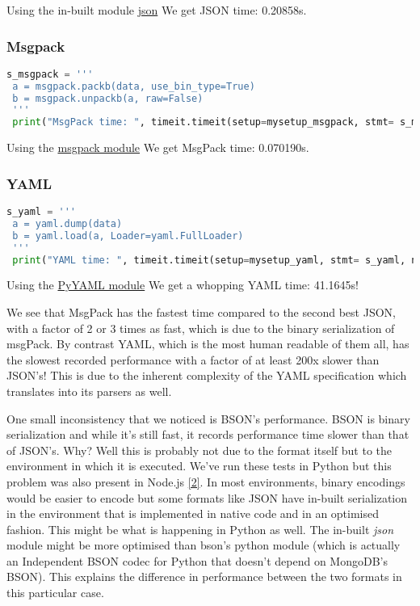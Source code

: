 \documentclass[12pt]{article}
\begin{document}
Using the in-built module \href{https://docs.python.org/3/library/json.html}{json}
We get JSON time:  0.20858s.

\subsubsection{Msgpack}
\begin{lstlisting}[language=python]
 s_msgpack = '''
 a = msgpack.packb(data, use_bin_type=True)
 b = msgpack.unpackb(a, raw=False)
 '''
 print("MsgPack time: ", timeit.timeit(setup=mysetup_msgpack, stmt= s_msgpack, number=10000))

\end{lstlisting}

Using the \href{https://github.com/msgpack/msgpack-python}{msgpack module}
We get MsgPack time:  0.070190s.

\subsubsection{YAML}
\begin{lstlisting}[language=python]
 s_yaml = '''
 a = yaml.dump(data)
 b = yaml.load(a, Loader=yaml.FullLoader)
 '''
 print("YAML time: ", timeit.timeit(setup=mysetup_yaml, stmt= s_yaml, number=10000))

\end{lstlisting}

Using the \href{https://pyyaml.org/wiki/PyYAMLDocumentation}{PyYAML module}
We get a whopping YAML time:  41.1645s!

We see that MsgPack has the fastest time compared to the second best JSON, with a factor of 2 or 3 times as fast, which is due to the binary serialization of msgPack. By contrast YAML, which is the most human readable of them all,  has the slowest recorded performance with a factor of at least 200x slower than JSON’s! This is due to the inherent complexity of the YAML specification which translates into its parsers as well.

One small inconsistency that we noticed is BSON’s performance. BSON is binary serialization and while it’s still fast, it records performance time slower than that of JSON’s. Why? Well this is probably not due to the format itself but to the environment in which it is executed. We’ve run these tests in Python but this problem was also present in Node.js \href{https://stackoverflow.com/questions/36767310/why-is-json-faster-than-bson-in-node-js}{[2]}. In most environments, binary encodings would be easier to encode but some formats like JSON have in-built serialization in the environment that is implemented in native code and in an optimised fashion. This might be what is happening in Python as well. The in-built \emph{json} module might be more optimised than bson’s python module (which is actually an Independent BSON codec for Python that doesn’t depend on MongoDB’s BSON). This explains the difference in performance between the two formats in this particular case.
\end{document}
